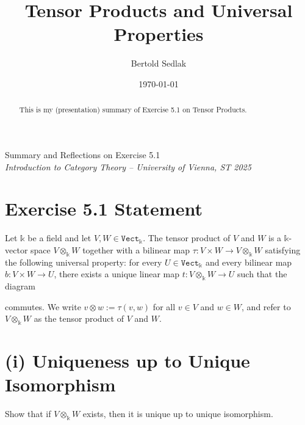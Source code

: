 \documentclass[10pt]{tufte-handout}
\title{Tensor Products and Universal Properties}
\author{Bertold Sedlak}
\date{\today}
\begin{document}
\maketitle

\begin{center}
\large Summary and Reflections on Exercise 5.1\\
\textit{Introduction to Category Theory – University of Vienna, ST 2025}
\end{center}
\vspace{1em}

\begin{abstract}
This is my (presentation) summary of Exercise 5.1 on Tensor Products.
\end{abstract}

\section*{Exercise 5.1 Statement}
Let $\mathds{k}$ be a field and let $V, W \in \texttt{Vect}_{\mathds{k}}$. The tensor product of $V$ and $W$ is a $\mathds{k}$-vector space $V \otimes_{\mathds{k}} W$ together with a bilinear map $\tau : V \times W \to V \otimes_{\mathds{k}} W$ satisfying the following universal property: for every $U \in \texttt{Vect}_{\mathds{k}}$ and every bilinear map $b : V \times W \to U$, there exists a unique linear map $t : V \otimes_{\mathds{k}} W \to U$ such that the diagram

\begin{center}
\end{center}

commutes. We write $v \otimes w := \tau(v, w)$ for all $v \in V$ and $w \in W$, and refer to $V \otimes_{\mathds{k}} W$ as the tensor product of $V$ and $W$.

\section{(i) Uniqueness up to Unique Isomorphism}
Show that if $V \otimes_{\mathds{k}} W$ exists, then it is unique up to unique isomorphism.
\end{document}
